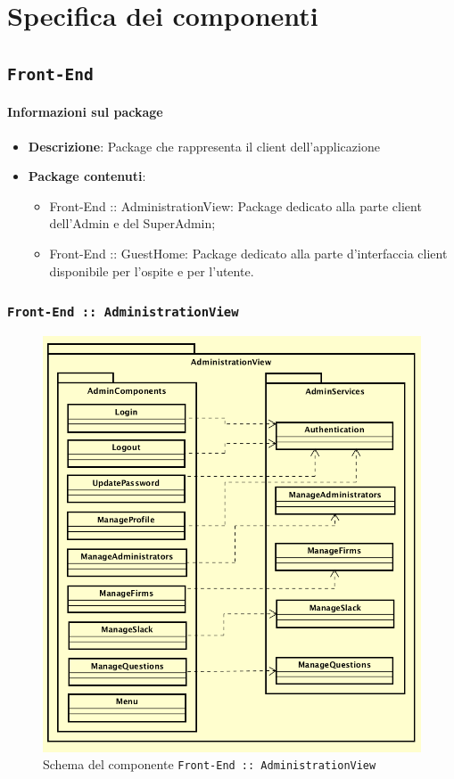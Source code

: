 \documentclass[../DefinizioneDiProdotto.tex]{subfiles}
\begin{document}
\section{Specifica dei componenti}

\subsection{ \texttt{Front-End}}\paragraph{Informazioni sul package}

\begin{itemize}\item \textbf{Descrizione}: Package che rappresenta il client dell'applicazione\item \textbf{Package contenuti}:
	\begin{itemize}
	\item Front-End :: AdministrationView: Package dedicato alla parte client dell'Admin e del SuperAdmin;
	\item Front-End :: GuestHome: Package dedicato alla parte d'interfaccia client disponibile per l'ospite e per l'utente.
	\end{itemize}\end{itemize}
		\subsubsection{ \texttt{Front-End :: AdministrationView}}
			\begin{figure}[!h]
				\centering
				\includegraphics[scale=0.7]{Architettura/Front-End/Administration/AdministrationView.png}
				\caption{Schema del componente \texttt{Front-End :: AdministrationView}}
			\end{figure}
\end{document}
